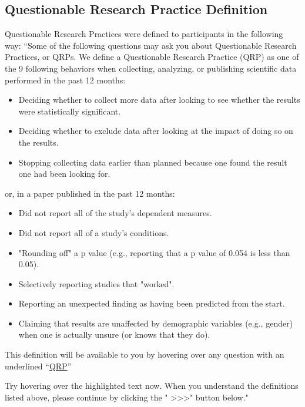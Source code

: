 \documentclass[man]{apa6}
\theoremstyle{definition}
\theoremstyle{definition}
\theoremstyle{definition}
\theoremstyle{remark}
\begin{document}
\subsection{Questionable Research Practice
Definition}\label{questionable-research-practice-definition}

Questionable Research Practices were defined to participants in the
following way: ``Some of the following questions may ask you about
Questionable Research Practices, or QRPs. We define a Questionable
Research Practice (QRP) as one of the 9 following behaviors when
collecting, analyzing, or publishing scientific data performed in the
past 12 months:

\begin{itemize}
\item Deciding whether to collect more data after looking to see whether the results were statistically significant.
\item Deciding whether to exclude data after looking at the impact of doing so on the results. 
\item Stopping collecting data earlier than planned because one found the result one had been looking for. 
\end{itemize}

or, in a paper published in the past 12 months:

\begin{itemize}
\item Did not report all of the study's dependent measures. 
\item Did not report all of a study's conditions.
\item "Rounding off" a p value (e.g., reporting that a p value of 0.054 is less than 0.05).
\item Selectively reporting studies that "worked". 
\item Reporting an unexpected finding as having been predicted from the start. 
\item Claiming that results are unaffected by demographic variables (e.g., gender) when one is actually unsure (or knows that they do).
 \end{itemize}

This definition will be available to you by hovering over any question
with an underlined \enquote{\underline{QRP}}

Try hovering over the highlighted text now. When you understand the
definitions listed above, please continue by clicking the "
\textgreater{}\textgreater{}\textgreater{}" button below."
\end{document}

